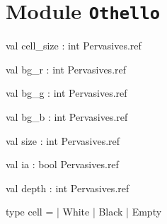 \documentclass[11pt]{article}
\begin{document}
\section{Module {\tt{Othello}}}
\label{module:Othello}


\ocamldocvspace{0.5cm}



\label{val:Othello.cell-underscoresize}\begin{ocamldoccode}
val cell_size : int Pervasives.ref
\end{ocamldoccode}




\label{val:Othello.bg-underscorer}\begin{ocamldoccode}
val bg_r : int Pervasives.ref
\end{ocamldoccode}




\label{val:Othello.bg-underscoreg}\begin{ocamldoccode}
val bg_g : int Pervasives.ref
\end{ocamldoccode}




\label{val:Othello.bg-underscoreb}\begin{ocamldoccode}
val bg_b : int Pervasives.ref
\end{ocamldoccode}




\label{val:Othello.size}\begin{ocamldoccode}
val size : int Pervasives.ref
\end{ocamldoccode}




\label{val:Othello.ia}\begin{ocamldoccode}
val ia : bool Pervasives.ref
\end{ocamldoccode}




\label{val:Othello.depth}\begin{ocamldoccode}
val depth : int Pervasives.ref
\end{ocamldoccode}




\label{type:Othello.cell}\begin{ocamldoccode}
type cell =
  | White
  | Black
  | Empty
\end{ocamldoccode}
\end{document}
